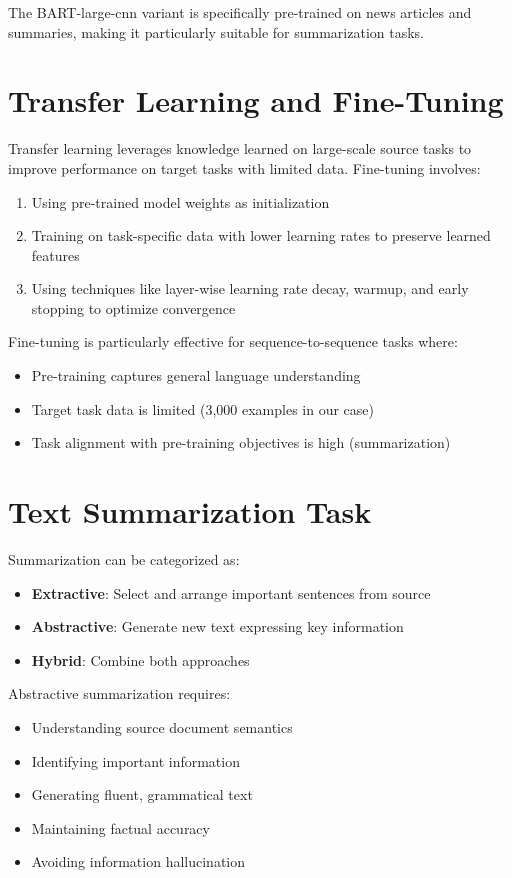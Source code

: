 \documentclass[12pt,a4paper,oneside]{report}
\begin{document}
The BART-large-cnn variant is specifically pre-trained on news articles and summaries, making it particularly suitable for summarization tasks.

\section{Transfer Learning and Fine-Tuning}
Transfer learning leverages knowledge learned on large-scale source tasks to improve performance on target tasks with limited data. Fine-tuning involves:
\begin{enumerate}
    \item Using pre-trained model weights as initialization
    \item Training on task-specific data with lower learning rates to preserve learned features
    \item Using techniques like layer-wise learning rate decay, warmup, and early stopping to optimize convergence
\end{enumerate}

Fine-tuning is particularly effective for sequence-to-sequence tasks where:
\begin{itemize}
    \item Pre-training captures general language understanding
    \item Target task data is limited (3,000 examples in our case)
    \item Task alignment with pre-training objectives is high (summarization)
\end{itemize}

\section{Text Summarization Task}
Summarization can be categorized as:
\begin{itemize}
    \item \textbf{Extractive}: Select and arrange important sentences from source
    \item \textbf{Abstractive}: Generate new text expressing key information
    \item \textbf{Hybrid}: Combine both approaches
\end{itemize}

Abstractive summarization requires:
\begin{itemize}
    \item Understanding source document semantics
    \item Identifying important information
    \item Generating fluent, grammatical text
    \item Maintaining factual accuracy
    \item Avoiding information hallucination
\end{itemize}
\end{document}
